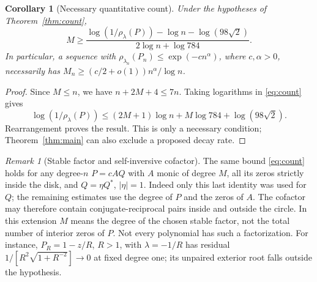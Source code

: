 \documentclass[11pt]{article}
\newtheorem{corollary}[theorem]{Corollary}
\theoremstyle{remark}\newtheorem{remark}[theorem]{Remark}
\begin{document}
\begin{corollary}[Necessary quantitative count]\label{cor:complexity}
Under the hypotheses of Theorem~\ref{thm:count},
\[
 M\ge\frac{\log(1/\rho_\lambda(P))-\log n-\log(98\sqrt2)}
              {2\log n+\log784}.
\]
In particular, a sequence with
\(\rho_{\lambda_n}(P_n)\le\exp(-c n^\alpha)\), where
\(c,\alpha>0\), necessarily has
\(M_n\ge(c/2+o(1))n^\alpha/\log n\).
\end{corollary}
\begin{proof}
Since \(M\le n\), we have \(n+2M+4\le7n\).
Taking logarithms in \eqref{eq:count} gives
\[
 \log(1/\rho_\lambda(P))
 \le(2M+1)\log n+M\log784+\log(98\sqrt2).
\]
Rearrangement proves the result. This is only a necessary condition;
Theorem~\ref{thm:main} can also exclude a proposed decay rate.
\end{proof}

\begin{remark}[Stable factor and self-inversive cofactor]\label{rem:structural}
The same bound \eqref{eq:count} holds for any degree-\(n\)
\(P=cAQ\) with \(A\) monic of degree \(M\), all its zeros
strictly inside the disk, and \(Q=\eta Q^*\), \(|\eta|=1\).
Indeed only this last identity was used for \(Q\); the remaining
estimates use the degree of \(P\) and the zeros of \(A\).
The cofactor may therefore contain conjugate-reciprocal pairs
inside and outside the circle. In this extension \(M\) means the
degree of the chosen stable factor, not the total number of interior
zeros of \(P\). Not every polynomial has such a factorization.
For instance, \(P_R=1-z/R\), \(R>1\), with \(\lambda=-1/R\)
has residual \(1/[R^2\sqrt{1+R^{-2}}]\to0\) at fixed degree one;
its unpaired exterior root falls outside the hypothesis.
\end{remark}
\end{document}

